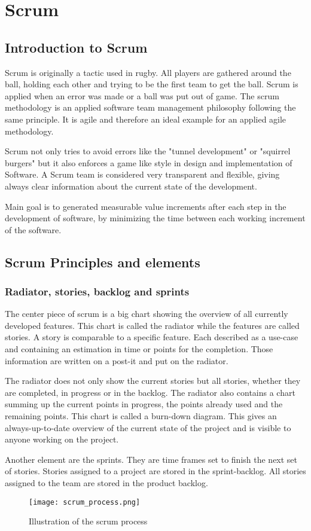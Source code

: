 \chapter{Scrum}
\section{Introduction to Scrum}

\par{
Scrum is originally a tactic used in rugby. All players are gathered around the ball, holding each other and trying to be the first team to get the ball. Scrum is applied when an error was made or a ball was put out of game. The scrum methodology is an applied software team management philosophy following the same principle. It is agile and therefore an ideal example for an applied agile methodology. 
\par{
Scrum not only tries to avoid errors like the "tunnel development" or "squirrel burgers" but it also enforces a game like style in design and implementation of Software. A Scrum team is considered very transparent and flexible, giving always clear information about the current state of the development. 
}
\par{
Main goal is to generated measurable value increments after each step in the development of software, by minimizing the time between each working increment of the software.
}
\section{Scrum Principles and elements}
\subsection{Radiator, stories, backlog and sprints}
\par{
The center piece of scrum is a big chart showing the overview of all currently developed features. This chart is called the radiator while the features are called stories. A story is comparable to a specific feature. Each described as a use-case and containing an estimation in time or points for the completion. Those information are written on a post-it and put on the radiator. 
}
\par{
The radiator does not only show the current stories but all stories, whether they are completed, in progress or in the backlog. The radiator also contains a chart summing up the current points in progress, the points already used and the remaining points. This chart is called a burn-down diagram. This gives an always-up-to-date overview of the current state of the project and is visible to anyone working on the project. 
}
\par{
Another element are the sprints. They are time frames set to finish the next set of stories. Stories assigned to a project are stored in the sprint-backlog. All stories assigned to the team are stored in the product backlog. 
}
\begin{figure}[h!]
\texttt{[image: scrum\_process.png]}
\caption{\label{scrumproc}Illustration of the scrum process}
\end{figure}

}
